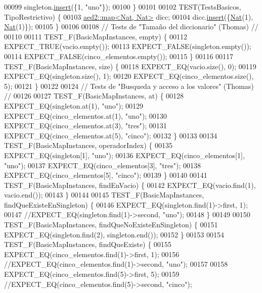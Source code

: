 \begin{DoxyCode}
00099     singleton.\hyperlink{classaed2_1_1map_a6941cde9a79c27f054b5c97a587a1854_a6941cde9a79c27f054b5c97a587a1854}{insert}(\{1, \textcolor{stringliteral}{"uno"}\});
00100 \}
00101 
00102 TEST(TestsBasicos, TipoRestrictivo) \{
00103     \hyperlink{classaed2_1_1map}{aed2::map<Nat, Nat>} dicc;
00104     dicc.\hyperlink{classaed2_1_1map_a6941cde9a79c27f054b5c97a587a1854_a6941cde9a79c27f054b5c97a587a1854}{insert}(\{\hyperlink{classNat}{Nat}(1), \hyperlink{classNat}{Nat}(1)\});
00105 \}
00106 
00108 \textcolor{comment}{// Tests de "Tamaño del diccionario" (Thomas) //}
00110 \textcolor{comment}{}
00111 TEST\_F(BasicMapInstances, empty) \{
00112     EXPECT\_TRUE(vacio.empty());
00113     EXPECT\_FALSE(singleton.empty());
00114     EXPECT\_FALSE(cinco\_elementos.empty());
00115 \}
00116 
00117 TEST\_F(BasicMapInstances, size) \{
00118     EXPECT\_EQ(vacio.size(), 0);
00119     EXPECT\_EQ(singleton.size(), 1);
00120     EXPECT\_EQ(cinco\_elementos.size(), 5);
00121 \}
00122 
00124 \textcolor{comment}{// Tests de "Busqueda y acceso a los valores" (Thomas) //}
00126 \textcolor{comment}{}
00127 TEST\_F(BasicMapInstances, at) \{
00128     EXPECT\_EQ(singleton.at(1), \textcolor{stringliteral}{"uno"});
00129     EXPECT\_EQ(cinco\_elementos.at(1), \textcolor{stringliteral}{"uno"});
00130     EXPECT\_EQ(cinco\_elementos.at(3), \textcolor{stringliteral}{"tres"});
00131     EXPECT\_EQ(cinco\_elementos.at(5), \textcolor{stringliteral}{"cinco"});
00132 \}
00133 
00134 TEST\_F(BasicMapInstances, operadorIndex) \{
00135     EXPECT\_EQ(singleton[1], \textcolor{stringliteral}{"uno"});
00136     EXPECT\_EQ(cinco\_elementos[1], \textcolor{stringliteral}{"uno"});
00137     EXPECT\_EQ(cinco\_elementos[3], \textcolor{stringliteral}{"tres"});
00138     EXPECT\_EQ(cinco\_elementos[5], \textcolor{stringliteral}{"cinco"});
00139 \}
00140 
00141 TEST\_F(BasicMapInstances, findEnVacio) \{
00142     EXPECT\_EQ(vacio.find(1), vacio.end());
00143 \}
00144 
00145 TEST\_F(BasicMapInstances, findQueExisteEnSingleton) \{
00146     EXPECT\_EQ(singleton.find(1)->first, 1);
00147     \textcolor{comment}{//EXPECT\_EQ(singleton.find(1)->second, "uno");}
00148 \}
00149 
00150 TEST\_F(BasicMapInstances, findQueNoExisteEnSingleton) \{
00151     EXPECT\_EQ(singleton.find(2), singleton.end());
00152 \}
00153 
00154 TEST\_F(BasicMapInstances, findQueExiste) \{
00155     EXPECT\_EQ(cinco\_elementos.find(1)->first, 1);
00156     \textcolor{comment}{//EXPECT\_EQ(cinco\_elementos.find(1)->second, "uno");}
00157 
00158     EXPECT\_EQ(cinco\_elementos.find(5)->first, 5);
00159     \textcolor{comment}{//EXPECT\_EQ(cinco\_elementos.find(5)->second, "cinco");}

\end{DoxyCode}
